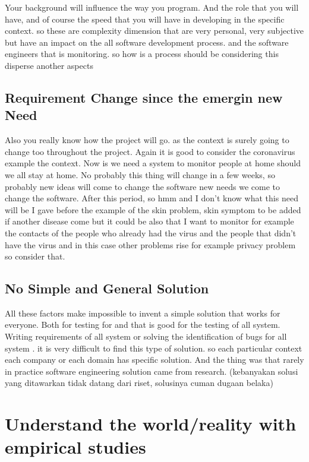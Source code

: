 \documentclass[conference, compsoc, twoside]{IEEEtran}
\begin{document}
Your background will influence the way you program.
And the role that you will have, and of course the speed that you will have in developing in the specific context. 
so these are complexity dimension that are very personal, very subjective but have an impact on the all software development process. 
and the software engineers that is monitoring.
so how is a process should be considering this disperse another aspects
\subsection{Requirement Change since the emergin new Need} %
\label{sub:requirement_change_as_new_need}

Also you really know how the project will go. 
as the context is surely going to change too throughout the project. 
Again it is good to consider the coronavirus example the context. 
Now is we need a system to monitor people at home should we all stay at home.
No probably this thing will change in a few weeks, so probably new ideas will come to change the software new needs we come to change the software. 
After this period, so hmm and I don't know what this need will be I gave before the example of the skin problem, skin symptom to be added if another disease come but it could be also that I want to monitor 
for example the contacts of the people who already had the virus and the people that didn't have the virus and in this case other problems rise 
for example privacy problem so consider that.

\subsection{No Simple and General Solution} %
\label{sub:no_simple_and_general_solution}
All these factors make impossible to invent a simple solution that works for everyone.
Both for testing for and that is good for the testing of all system. 
Writing requirements of all system or solving the identification of bugs for all system .
it is very difficult to find this type of solution. 
so each particular context each company or each domain has specific solution.
And the thing was that rarely in practice software engineering solution came from research. 
(kebanyakan solusi yang ditawarkan tidak datang dari riset, solusinya cuman dugaan belaka)

\section{Understand the world/reality with empirical studies} %
\label{sec:understand_the_world}
\end{document}
